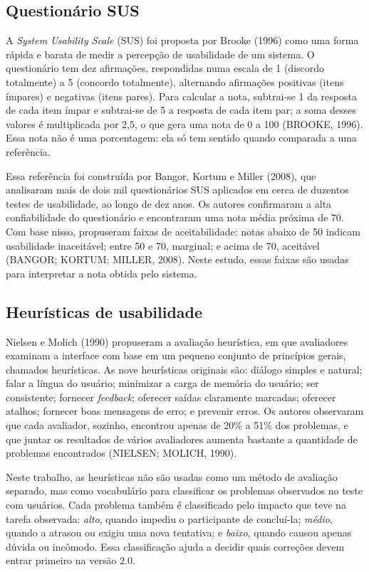 \documentclass[a4paper,12pt]{article}
\begin{document}
\subsection{Questionário SUS}

A \emph{System Usability Scale} (SUS) foi proposta por Brooke (1996)
como uma forma rápida e barata de medir a percepção de usabilidade de um
sistema. O questionário tem dez afirmações, respondidas numa escala de 1
(discordo totalmente) a 5 (concordo totalmente), alternando afirmações
positivas (itens ímpares) e negativas (itens pares). Para calcular a
nota, subtrai-se 1 da resposta de cada item ímpar e subtrai-se de 5 a
resposta de cada item par; a soma desses valores é multiplicada por
2,5, o que gera uma nota de 0 a 100 (BROOKE, 1996). Essa nota não é uma
porcentagem: ela só tem sentido quando comparada a uma referência.

Essa referência foi construída por Bangor, Kortum e Miller (2008), que
analisaram mais de dois mil questionários SUS aplicados em cerca de
duzentos testes de usabilidade, ao longo de dez anos. Os autores
confirmaram a alta confiabilidade do questionário e encontraram uma nota
média próxima de 70. Com base nisso, propuseram faixas de
aceitabilidade: notas abaixo de 50 indicam usabilidade inaceitável;
entre 50 e 70, marginal; e acima de 70, aceitável (BANGOR; KORTUM;
MILLER, 2008). Neste estudo, essas faixas são usadas para interpretar a
nota obtida pelo sistema.

\subsection{Heurísticas de usabilidade}

Nielsen e Molich (1990) propuseram a avaliação heurística, em que
avaliadores examinam a interface com base em um pequeno conjunto de
princípios gerais, chamados heurísticas. As nove heurísticas originais
são: diálogo simples e natural; falar a língua do usuário; minimizar a
carga de memória do usuário; ser consistente; fornecer \emph{feedback};
oferecer saídas claramente marcadas; oferecer atalhos; fornecer boas
mensagens de erro; e prevenir erros. Os autores observaram que cada
avaliador, sozinho, encontrou apenas de 20\% a 51\% dos problemas, e
que juntar os resultados de vários avaliadores aumenta bastante a
quantidade de problemas encontrados (NIELSEN; MOLICH, 1990).

Neste trabalho, as heurísticas não são usadas como um método de
avaliação separado, mas como vocabulário para classificar os problemas
observados no teste com usuários. Cada problema também é classificado
pelo impacto que teve na tarefa observada: \emph{alto}, quando impediu o
participante de concluí-la; \emph{médio}, quando a atrasou ou exigiu uma
nova tentativa; e \emph{baixo}, quando causou apenas dúvida ou
incômodo. Essa classificação ajuda a decidir quais correções devem
entrar primeiro na versão 2.0.
\end{document}
